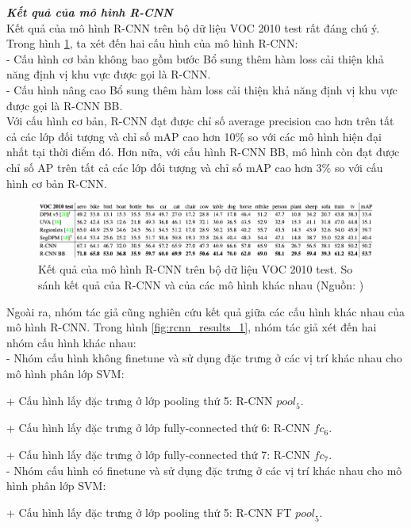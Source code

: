 {    \noindent
    \textbf{\textit{Kết quả của mô hình R-CNN}} \\
    Kết quả của mô hình R-CNN trên bộ dữ liệu VOC 2010 test rất đáng chú ý.
    Trong hình \ref{fig:rcnn_results_3}, ta xét đến hai cấu hình của mô hình R-CNN: \\
    - Cấu hình cơ bản không bao gồm bước Bổ sung thêm hàm loss cải thiện khả năng định vị khu vực được gọi là R-CNN. \\
    - Cấu hình nâng cao Bổ sung thêm hàm loss cải thiện khả năng định vị khu vực được gọi là R-CNN BB. \\
    Với cấu hình cơ bản, R-CNN đạt được chỉ số average precision cao hơn trên tất cả các lớp đối tượng và chỉ số mAP cao hơn 10\% so với các mô hình hiện đại nhất tại thời điểm đó.
    Hơn nữa, với cấu hình R-CNN BB, mô hình còn đạt được chỉ số AP trên tất cả các lớp đối tượng và chỉ số mAP cao hơn 3\% so với cấu hình cơ bản R-CNN.
    \begin{figure}[H]
        \centering
        \includegraphics[width=15cm] {images/rcnn_results_3}
        \caption{Kết quả của mô hình R-CNN trên bộ dữ liệu VOC 2010 test. So sánh kết quả của R-CNN và của các mô hình khác nhau (Nguồn: \cite{girshick2014rich})}
        \label{fig:rcnn_results_3}
    \end{figure}
    \noindent
    Ngoài ra, nhóm tác giả cũng nghiên cứu kết quả giữa các cấu hình khác nhau của mô hình R-CNN.
    Trong hình \ref{fig:rcnn_results_1}, nhóm tác giả xét đến hai nhóm cấu hình khác nhau: \\
    - Nhóm cấu hình không finetune và sử dụng đặc trưng ở các vị trí khác nhau cho mô hình phân lớp SVM: \par
    + Cấu hình lấy đặc trưng ở lớp pooling thứ 5: R-CNN ${pool}_{5}$. \par
    + Cấu hình lấy đặc trưng ở lớp fully-connected thứ 6: R-CNN ${fc}_{6}$. \par
    + Cấu hình lấy đặc trưng ở lớp fully-connected thứ 7: R-CNN ${fc}_{7}$. \\
    - Nhóm cấu hình có finetune và sử dụng đặc trưng ở các vị trí khác nhau cho mô hình phân lớp SVM: \par
    + Cấu hình lấy đặc trưng ở lớp pooling thứ 5: R-CNN FT ${pool}_{5}$. \par
}
